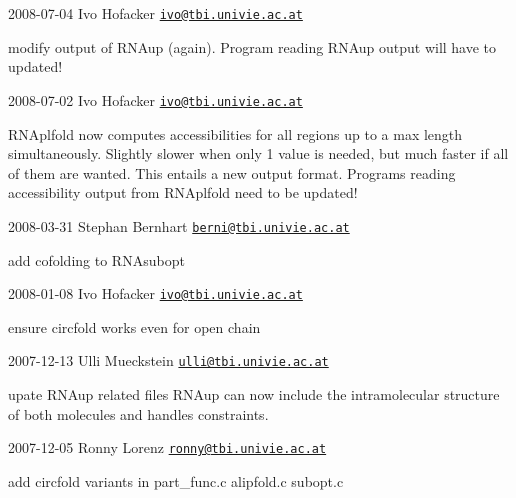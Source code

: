 2008-\/07-\/04 Ivo Hofacker \href{mailto:ivo@tbi.univie.ac.at}{\tt ivo@tbi.\+univie.\+ac.\+at}


\begin{DoxyItemize}
\item modify output of R\+N\+Aup (again). Program reading R\+N\+Aup output will have to updated!
\end{DoxyItemize}

2008-\/07-\/02 Ivo Hofacker \href{mailto:ivo@tbi.univie.ac.at}{\tt ivo@tbi.\+univie.\+ac.\+at}


\begin{DoxyItemize}
\item R\+N\+Aplfold now computes accessibilities for all regions up to a max length simultaneously. Slightly slower when only 1 value is needed, but much faster if all of them are wanted. This entails a new output format. Programs reading accessibility output from R\+N\+Aplfold need to be updated!
\end{DoxyItemize}

2008-\/03-\/31 Stephan Bernhart \href{mailto:berni@tbi.univie.ac.at}{\tt berni@tbi.\+univie.\+ac.\+at}


\begin{DoxyItemize}
\item add cofolding to R\+N\+Asubopt
\end{DoxyItemize}

2008-\/01-\/08 Ivo Hofacker \href{mailto:ivo@tbi.univie.ac.at}{\tt ivo@tbi.\+univie.\+ac.\+at}


\begin{DoxyItemize}
\item ensure circfold works even for open chain
\end{DoxyItemize}

2007-\/12-\/13 Ulli Mueckstein \href{mailto:ulli@tbi.univie.ac.at}{\tt ulli@tbi.\+univie.\+ac.\+at}


\begin{DoxyItemize}
\item upate R\+N\+Aup related files R\+N\+Aup can now include the intramolecular structure of both molecules and handles constraints.
\end{DoxyItemize}

2007-\/12-\/05 Ronny Lorenz \href{mailto:ronny@tbi.univie.ac.at}{\tt ronny@tbi.\+univie.\+ac.\+at}


\begin{DoxyItemize}
\item add circfold variants in part\+\_\+func.\+c alipfold.\+c subopt.\+c
\end{DoxyItemize}

